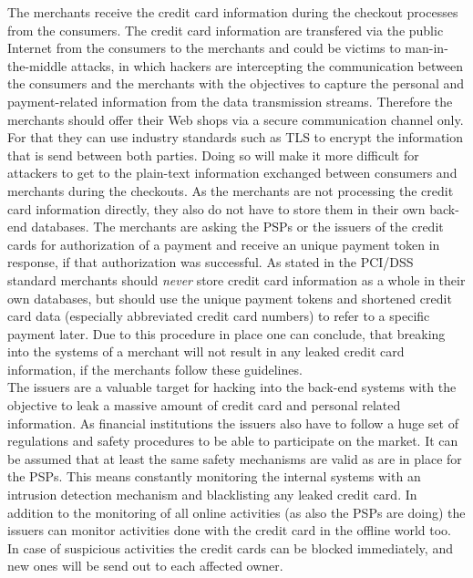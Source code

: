 The merchants receive the credit card information during the checkout processes from the consumers. The credit card information are transfered via the public Internet from the consumers to the merchants and could be victims to man-in-the-middle attacks, in which hackers are intercepting the communication between the consumers and the merchants with the objectives to capture the personal and payment-related information from the data transmission streams. Therefore the merchants should offer their Web shops via a secure communication channel only. For that they can use industry standards such as \gls{TLS} to encrypt the information that is send between both parties. Doing so will make it more difficult for attackers to get to the plain-text information exchanged between consumers and merchants during the checkouts. As the merchants are not processing the credit card information directly, they also do not have to store them in their own back-end databases. The merchants are asking the \gls{PSP}s or the issuers of the credit cards for authorization of a payment and receive an unique payment token in response, if that authorization was successful. As stated in the \gls{PCI/DSS} standard \citep{virtue2009payment} merchants should \emph{never} store credit card information as a whole in their own databases, but should use the unique payment tokens and shortened credit card data (especially abbreviated credit card numbers) to refer to a specific payment later. Due to this procedure in place one can conclude, that breaking into the systems of a merchant will not result in any leaked credit card information, if the merchants follow these guidelines. \\

The issuers are a valuable target for hacking into the back-end systems with the objective to leak a massive amount of credit card and personal related information. As financial institutions the issuers also have to follow a huge set of regulations and safety procedures to be able to participate on the market. It can be assumed that at least the same safety mechanisms are valid as are in place for the \gls{PSP}s. This means constantly monitoring the internal systems with an intrusion detection mechanism and blacklisting any leaked credit card. In addition to the monitoring of all online activities (as also the \gls{PSP}s are doing) the issuers can monitor activities done with the credit card in the offline world too. In case of suspicious activities the credit cards can be blocked immediately, and new ones will be send out to each affected owner. \\

